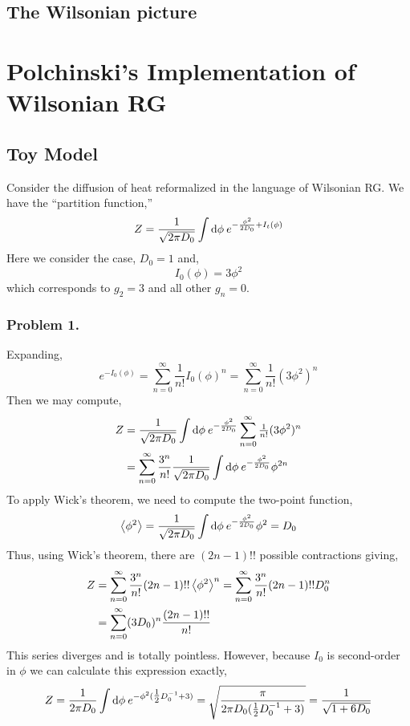 \documentclass[12pt]{article}
\begin{document}
\subsection{The Wilsonian picture}

\section{Polchinski’s Implementation of Wilsonian RG}

\subsection{Toy Model}

Consider the diffusion of heat reformalized in the language of Wilsonian RG. We have the ``partition function,''
\[ Z = \frac{1}{\sqrt{2 \pi D_0}} \int \mathrm{d}\phi \: e^{- \frac{\phi^2}{2 D_0}  + I_t(\phi)} \]
Here we consider the case, $D_0 = 1$ and,
\[ I_0(\phi) = 3 \phi^2 \]
which corresponds to $g_2 = 3$ and all other $g_n = 0$.

\subsubsection{Problem 1.}

Expanding,
\[ e^{-I_0(\phi)} = \sum_{n = 0}^\infty \frac{1}{n!} I_0(\phi)^n = \sum_{n = 0}^\infty \frac{1}{n!} (3 \phi^2)^n \]
Then we may compute,
\begin{align*}
Z & = \frac{1}{\sqrt{2 \pi D_0}} \int \mathrm{d}\phi \: e^{- \frac{\phi^2}{2 D_0}} \sum_{n = 0}^\infty \tfrac{1}{n!} (3 \phi^2)^n 
\\
& = \sum_{n = 0}^\infty \frac{3^n}{n!} \frac{1}{\sqrt{2 \pi D_0}} \int \mathrm{d}\phi \: e^{- \frac{\phi^2}{2 D_0}} \phi^{2n}
\end{align*}
To apply Wick's theorem, we need to compute the two-point function,
\[ \left< \phi^2 \right> = \frac{1}{\sqrt{2 \pi D_0}} \int \mathrm{d}\phi \: e^{- \frac{\phi^2}{2 D_0}} \phi^{2} = D_0 \]
Thus, using Wick's theorem, there are  $(2n - 1)!!$ possible contractions giving,
\begin{align*}
Z & = \sum_{n = 0}^\infty \frac{3^n}{n!} (2n - 1)!! \left< \phi^2 \right>^n = \sum_{n = 0}^\infty \frac{3^n}{n!} (2n - 1)!! D_0^{n} 
\\
& = \sum_{n = 0}^\infty (3 D_0)^n \frac{(2n - 1)!!}{n!}
\end{align*}
This series diverges and is totally pointless. However, because $I_0$ is second-order in $\phi$ we can calculate this expression exactly,
\begin{align*}
Z = \frac{1}{2 \pi D_0} \int \mathrm{d}\phi \: e^{-\phi^2 (\tfrac{1}{2} D_0^{-1} + 3)} = \sqrt{\frac{\pi}{2 \pi D_0 (\tfrac{1}{2} D_0^{-1} + 3)}} = \frac{1}{\sqrt{1 + 6 D_0}} 
\end{align*} 
\end{document}
